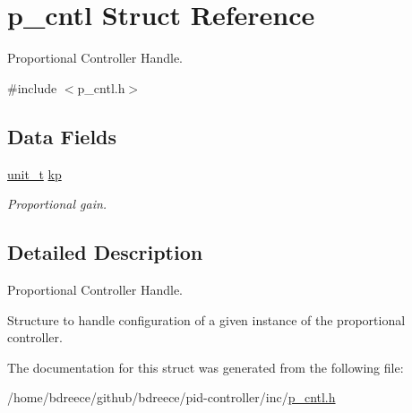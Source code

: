 \hypertarget{structp__cntl}{}\section{p\+\_\+cntl Struct Reference}
\label{structp__cntl}


Proportional Controller Handle.  




{\ttfamily \#include $<$p\+\_\+cntl.\+h$>$}

\subsection*{Data Fields}
\begin{DoxyCompactItemize}
\item 
\mbox{\label{structp__cntl_a944ef2814f8a9fac7b0abfe4fb061c5b}} 
\hyperlink{pid__conf_8h_a86e89cbe1fee619005bafce52850ab0c}{unit\+\_\+t} \hyperlink{structp__cntl_a944ef2814f8a9fac7b0abfe4fb061c5b}{kp}
\begin{DoxyCompactList}\small\item\em Proportional gain. \end{DoxyCompactList}\end{DoxyCompactItemize}


\subsection{Detailed Description}
Proportional Controller Handle. 

Structure to handle configuration of a given instance of the proportional controller. 

The documentation for this struct was generated from the following file\+:\begin{DoxyCompactItemize}
\item 
/home/bdreece/github/bdreece/pid-\/controller/inc/\hyperlink{p__cntl_8h}{p\+\_\+cntl.\+h}\end{DoxyCompactItemize}
